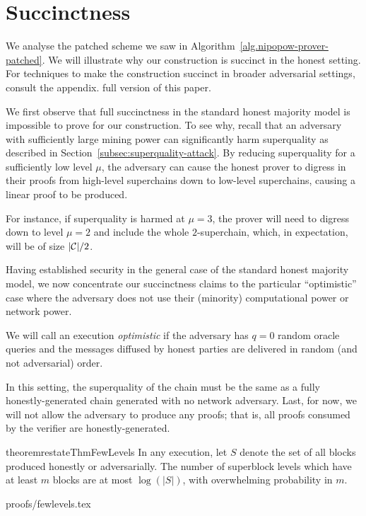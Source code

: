 \section{Succinctness}
\label{sec:succinctness}

We analyse the patched scheme we saw in
Algorithm~\ref{alg.nipopow-prover-patched}. We will illustrate why our
construction is succinct in the honest setting. For techniques to make the
construction succinct in broader adversarial settings, consult the
\ifhasappendix
appendix.
\else
full version of this paper.
\fi

We first observe that full succinctness in the standard honest majority model is
impossible to prove for our construction. To see why, recall that an adversary
with sufficiently large mining power can significantly harm superquality as
described in Section~\ref{subsec:superquality-attack}. By reducing superquality
for a sufficiently low level $\mu$, the adversary can cause the honest prover to
digress in their proofs from high-level superchains down to low-level
superchains, causing a linear proof to be produced.

For instance, if superquality is harmed at $\mu = 3$, the prover will
need to digress down to level $\mu = 2$ and include the whole $2$-superchain,
which, in expectation, will be of size $|\mathcal{C}|/2$.

Having established security in the general case of the standard honest majority
model, we now concentrate our succinctness claims to the particular
``optimistic'' case where the adversary does not use their (minority)
computational power or network power.

\begin{definition}
  We will call an execution \emph{optimistic} if the adversary has $q = 0$
  random oracle queries and the messages diffused by honest parties are
  delivered in random (and not adversarial) order.
\end{definition}

In this setting, the superquality of the chain must be the same as a fully
honestly-generated chain generated with no network adversary. Last, for now, we
will not allow the adversary to produce any proofs; that is, all proofs consumed
by the verifier are honestly-generated.

\begin{restatable}{theorem}{restateThmFewLevels}
    \label{thm.few-levels}
    In any execution, let $S$ denote the set of all blocks produced honestly or
    adversarially. The number of superblock levels which have at least $m$
    blocks are at most $\log(|S|)$, with overwhelming probability in $m$.
\end{restatable}
\ifonecolumn
{proofs/fewlevels.tex}
\fi

